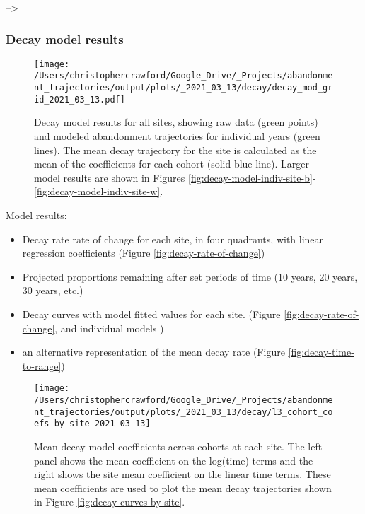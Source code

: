 \documentclass[9pt,twoside,lineno]{pnas-new}
\providecommand{\tightlist}{%
  \setlength{\itemsep}{0pt}\setlength{\parskip}{0pt}}
\begin{document}
--\textgreater{}

\hypertarget{decay-model-results}{%
\subsubsection{Decay model results}\label{decay-model-results}}



\begin{figure}
\centering
\texttt{[image: /Users/christophercrawford/Google\_Drive/\_Projects/abandonment\_trajectories/output/plots/\_2021\_03\_13/decay/decay\_mod\_grid\_2021\_03\_13.pdf]}
\caption{\label{fig:decay-model-grid}Decay model results for all sites, showing raw data (green points) and modeled abandonment trajectories for individual years (green lines). The mean decay trajectory for the site is calculated as the mean of the coefficients for each cohort (solid blue line). Larger model results are shown in Figures \ref{fig:decay-model-indiv-site-b}-\ref{fig:decay-model-indiv-site-w}.}
\end{figure}

Model results:

\begin{itemize}
\tightlist
\item
  Decay rate rate of change for each site, in four quadrants, with linear regression coefficients (Figure \ref{fig:decay-rate-of-change})
\item
  Projected proportions remaining after set periods of time (10 years, 20 years, 30 years, etc.)
\item
  Decay curves with model fitted values for each site. (Figure \ref{fig:decay-rate-of-change}, and individual models )
\item
  an alternative representation of the mean decay rate (Figure \ref{fig:decay-time-to-range})
\end{itemize}



\begin{figure}
\texttt{[image: /Users/christophercrawford/Google\_Drive/\_Projects/abandonment\_trajectories/output/plots/\_2021\_03\_13/decay/l3\_cohort\_coefs\_by\_site\_2021\_03\_13]} \caption{Mean decay model coefficients across cohorts at each site. The left panel shows the mean coefficient on the log(time) terms and the right shows the site mean coefficient on the linear time terms. These mean coefficients are used to plot the mean decay trajectories shown in Figure \ref{fig:decay-curves-by-site}.}\label{fig:decay-mod-coef}
\end{figure}
\end{document}
